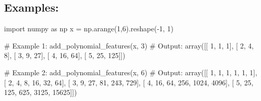 \documentclass[]{article}
\newenvironment{Shaded}{\begin{snugshade}}{\end{snugshade}}
\newcommand{\CommentTok}[1]{\textcolor[rgb]{0.48,0.49,0.49}{#1}}
\newcommand{\DecValTok}[1]{\textcolor[rgb]{0.96,0.45,0.00}{#1}}
\newcommand{\ImportTok}[1]{\textcolor[rgb]{0.15,0.68,0.38}{#1}}
\newcommand{\NormalTok}[1]{\textcolor[rgb]{0.81,0.81,0.76}{#1}}
\newcommand{\OperatorTok}[1]{\textcolor[rgb]{0.81,0.81,0.76}{#1}}
\begin{document}
\hypertarget{examples-1}{%
\subsection{Examples:}\label{examples-1}}

\begin{Shaded}
\begin{Highlighting}[]
\ImportTok{import}\NormalTok{ numpy }\ImportTok{as}\NormalTok{ np}
\NormalTok{x }\OperatorTok{=}\NormalTok{ np.arange(}\DecValTok{1}\NormalTok{,}\DecValTok{6}\NormalTok{).reshape(}\OperatorTok{-}\DecValTok{1}\NormalTok{, }\DecValTok{1}\NormalTok{)}

\CommentTok{# Example 1:}
\NormalTok{add_polynomial_features(x, }\DecValTok{3}\NormalTok{)}
\CommentTok{# Output:}
\NormalTok{array([[  }\DecValTok{1}\NormalTok{,   }\DecValTok{1}\NormalTok{,   }\DecValTok{1}\NormalTok{],}
\NormalTok{       [  }\DecValTok{2}\NormalTok{,   }\DecValTok{4}\NormalTok{,   }\DecValTok{8}\NormalTok{],}
\NormalTok{       [  }\DecValTok{3}\NormalTok{,   }\DecValTok{9}\NormalTok{,  }\DecValTok{27}\NormalTok{],}
\NormalTok{       [  }\DecValTok{4}\NormalTok{,  }\DecValTok{16}\NormalTok{,  }\DecValTok{64}\NormalTok{],}
\NormalTok{       [  }\DecValTok{5}\NormalTok{,  }\DecValTok{25}\NormalTok{, }\DecValTok{125}\NormalTok{]])}


\CommentTok{# Example 2:}
\NormalTok{add_polynomial_features(x, }\DecValTok{6}\NormalTok{)}
\CommentTok{# Output:}
\NormalTok{array([[    }\DecValTok{1}\NormalTok{,     }\DecValTok{1}\NormalTok{,     }\DecValTok{1}\NormalTok{,     }\DecValTok{1}\NormalTok{,     }\DecValTok{1}\NormalTok{,     }\DecValTok{1}\NormalTok{],}
\NormalTok{       [    }\DecValTok{2}\NormalTok{,     }\DecValTok{4}\NormalTok{,     }\DecValTok{8}\NormalTok{,    }\DecValTok{16}\NormalTok{,    }\DecValTok{32}\NormalTok{,    }\DecValTok{64}\NormalTok{],}
\NormalTok{       [    }\DecValTok{3}\NormalTok{,     }\DecValTok{9}\NormalTok{,    }\DecValTok{27}\NormalTok{,    }\DecValTok{81}\NormalTok{,   }\DecValTok{243}\NormalTok{,   }\DecValTok{729}\NormalTok{],}
\NormalTok{       [    }\DecValTok{4}\NormalTok{,    }\DecValTok{16}\NormalTok{,    }\DecValTok{64}\NormalTok{,   }\DecValTok{256}\NormalTok{,  }\DecValTok{1024}\NormalTok{,  }\DecValTok{4096}\NormalTok{],}
\NormalTok{       [    }\DecValTok{5}\NormalTok{,    }\DecValTok{25}\NormalTok{,   }\DecValTok{125}\NormalTok{,   }\DecValTok{625}\NormalTok{,  }\DecValTok{3125}\NormalTok{, }\DecValTok{15625}\NormalTok{]])}
\end{Highlighting}
\end{Shaded}
\end{document}
